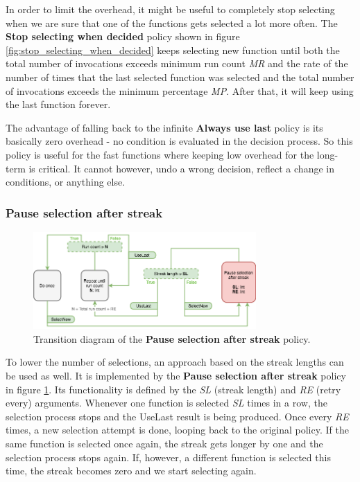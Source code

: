 In order to limit the overhead, it might be useful to completely stop selecting when we are sure that one of the functions gets selected a lot more often. The \textbf{Stop selecting when decided} policy shown in figure \ref{fig:stop_selecting_when_decided} keeps selecting new function until both the total number of invocations exceeds minimum run count \textit{MR} and the rate of the number of times that the last selected function was selected and the total number of invocations exceeds the minimum percentage \textit{MP}. After that, it will keep using the last function forever. 

The advantage of falling back to the infinite \textbf{Always use last} policy is its basically zero overhead - no condition is evaluated in the decision process. So this policy is useful for the fast functions where keeping low overhead for the long-term is critical. It cannot however, undo a wrong decision, reflect a change in conditions, or anything else.

\subsubsection{Pause selection after streak}

\begin{figure}[h!]
	\centerline{\mbox{\includegraphics[width=85mm]{./img/pause_selection_after_streak.png}}}
	\caption{Transition diagram of the \textbf{Pause selection after streak} policy.}
	\label{fig:pause_selection_after_streak}
\end{figure}

To lower the number of selections, an approach based on the streak lengths can be used as well. It is implemented by the \textbf{Pause selection after streak} policy in figure \ref{fig:pause_selection_after_streak}. Its functionality is defined by the \textit{SL} (streak length) and \textit{RE} (retry every) arguments. Whenever one function is selected \textit{SL} times in a row, the selection process stops and the UseLast result is being produced. Once every \textit{RE} times, a new selection attempt is done, looping back to the original policy. If the same function is selected once again, the streak gets longer by one and the selection process stops again. If, however, a different function is selected this time, the streak becomes zero and we start selecting again.

